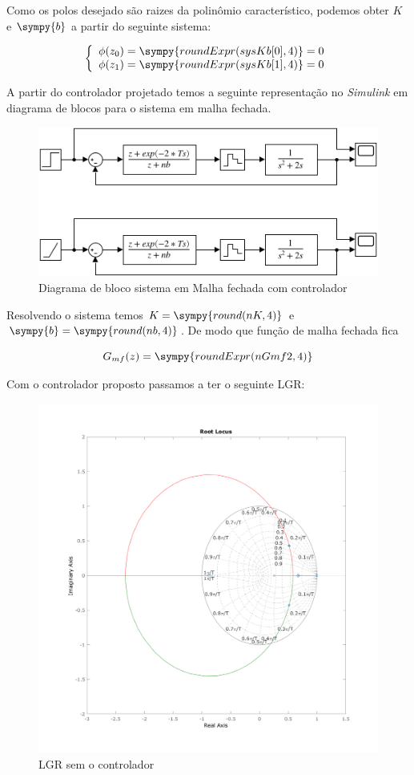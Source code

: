 \documentclass[a4paper,11pt]{article}
\newcommand{\npy}[1]{\sympy{round(#1,4)}}
\begin{document}
Como os polos desejado são raizes da polinômio característico, podemos obter $K$ e $\sympy{b}$ a partir do seguinte sistema:

$$
\left\{
\begin{array}{l}
    \phi(z_0) = \sympy{roundExpr(sysKb[0],4)} = 0\\
    \phi(z_1) = \sympy{roundExpr(sysKb[1],4)} = 0
\end{array}
\right.
$$

A partir do controlador projetado temos a seguinte representação no \textit{Simulink} em diagrama de blocos para o sistema em malha fechada.

\begin{figure}[H]
    \centering
    \includegraphics[width=0.8\linewidth]{img/exsim3modelPart2.png}
    \caption{Diagrama de bloco sistema em Malha fechada com controlador}
\end{figure}

Resolvendo o sistema temos $K = \npy{nK}$ e $\sympy{b} = \npy{nb}$. De modo que função de malha fechada fica

\begin{equation}
    G_{mf}(z) = \sympy{roundExpr(nGmf2,4)}
\end{equation}

Com o controlador proposto passamos a ter o seguinte LGR:

\begin{figure}[H]
    \centering
    \includegraphics[width=0.9\linewidth]{img/exsim3-rlocus-g2-control.png}
    \caption{LGR sem o controlador}
    \label{fig:ex3-rlocus-g2-control}
\end{figure}
\end{document}
